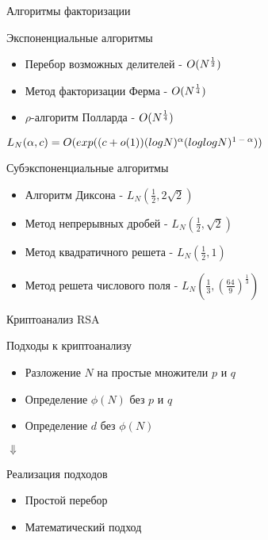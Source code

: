 \begin{frame}{Алгоритмы факторизации}
	\begin{block}{Экспоненциальные алгоритмы}
		\begin{itemize}
			\item Перебор возможных делителей - {$O(N\textsuperscript{{$\frac{1}{2}$}})$}
			\item Метод факторизации Ферма - {$O(N\textsuperscript{{$\frac{1}{4}$}})$}
	        \item {$\rho$}-алгоритм Полларда - {$O(N\textsuperscript{{$\frac{1}{4}$}})$}	        
    	\end{itemize}
	\end{block}

	\begin{center}
		$L_N(\alpha,c)=O(exp((c+o(1))(logN)^\alpha(loglogN)\textsuperscript{{$1-\alpha$}}))$
	\end{center}

	\begin{block}{Субэкспоненциальные алгоритмы}
		\begin{itemize}
			\item Алгоритм Диксона - {$L_N(\frac{1}{2}, 2\sqrt{2})$}
	        \item Метод непрерывных дробей - {$L_N(\frac{1}{2}, \sqrt{2})$}
	        \item Метод квадратичного решета - {$L_N(\frac{1}{2}, 1)$}
	        \item Метод решета числового поля - {$L_N(\frac{1}{3}, (\frac{64}{9})^\frac{1}{3})$} 
    	\end{itemize}
	\end{block}
\end{frame}

\begin{frame}{Криптоанализ RSA}
	\begin{center}

		\begin{block}{Подходы к криптоанализу}
			\begin{itemize}
		        \item Разложение $N$ на простые множители $p$ и $q$ \vspace{0.5cm}
		        \item Определение $\phi(N)$ без $p$ и $q$ \vspace{0.5cm}
		        \item Определение $d$ без $\phi(N)$
    		\end{itemize}
		\end{block}	 		

		$\Downarrow$

	 	\begin{block}{Реализация подходов}
	 		\begin{itemize}
		        \item Простой перебор
		        \item Математический подход
    		\end{itemize}
	 	\end{block}	
    
	\end{center}
\end{frame}

